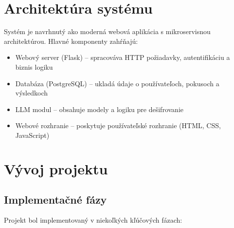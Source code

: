 \documentclass[12pt,a4paper]{article}
\begin{document}
\section{Architektúra systému}
Systém je navrhnutý ako moderná webová aplikácia s mikroservisnou architektúrou. Hlavné komponenty zahŕňajú:

\begin{itemize}
    \item Webový server (Flask) -- spracováva HTTP požiadavky, autentifikáciu a biznis logiku
    \item Databáza (PostgreSQL) -- ukladá údaje o používateľoch, pokusoch a výsledkoch
    \item LLM modul -- obsahuje modely a logiku pre dešifrovanie
    \item Webové rozhranie -- poskytuje používateľské rozhranie (HTML, CSS, JavaScript)
\end{itemize}

\section{Vývoj projektu}
\subsection{Implementačné fázy}
Projekt bol implementovaný v niekoľkých kľúčových fázach:
\end{document}
